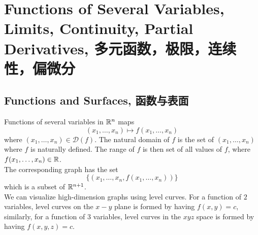 \section{Functions of Several Variables, Limits, Continuity, Partial Derivatives, 多元函数，极限，连续性，偏微分}
\subsection{Functions and Surfaces, 函数与表面}
Functions of several variables in $\mathbb{R}^n$ maps
$$(x_1, \dots, x_n) \mapsto f(x_1, \dots, x_n)$$
where $(x_1, \dots, x_n) \in \mathscr{D}(f)$. The natural domain of $f$ is the set of $(x_1, \dots, x_n)$ where $f$ is naturally defined. The range of $f$ is then set of all values of $f$, where $f(x_1, \dots, x_n) \in \mathbb{R}$. \\
The corresponding graph has the set
$$\{(x_1, \dots, x_n, f(x_1, \dots, x_n))\}$$
which is a subset of $\mathbb{R}^{n+1}$. \\
We can visualize high-dimension graphs using level curves. For a function of $2$ variables, level curves on the $x-y$ plane is formed by having $f(x, y)=c$, similarly, for a function of $3$ variables, level curves in the $xyz$ space is formed by having $f(x, y, z) = c$.

